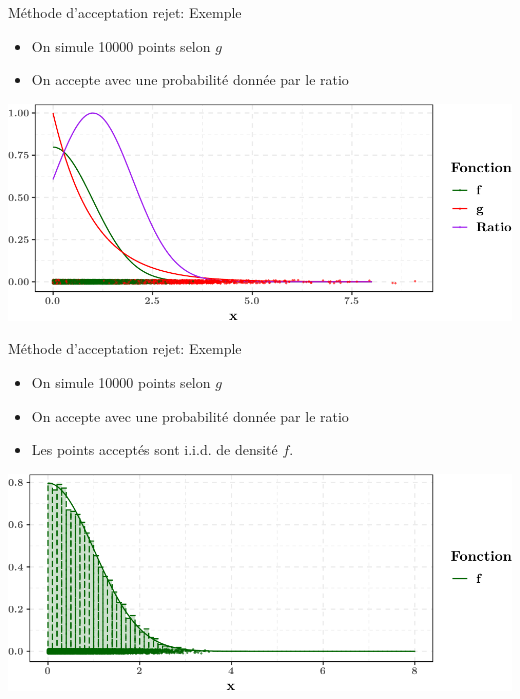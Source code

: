 \documentclass[ignorenonframetext,]{beamer}
\providecommand{\tightlist}{%
  \setlength{\itemsep}{0pt}\setlength{\parskip}{0pt}}
\begin{document}
\begin{frame}{Méthode d'acceptation rejet: Exemple}
\protect\hypertarget{muxe9thode-dacceptation-rejet-exemple-2}{}

\begin{itemize}
\tightlist
\item
  On simule 10000 points selon \(g\)
\item
  On accepte avec une probabilité donnée par le ratio
\end{itemize}

\includegraphics{diapos_simulation_variables_aleatoires_files/figure-beamer/plot_simulated_accepted-1.pdf}

\end{frame}

\begin{frame}{Méthode d'acceptation rejet: Exemple}
\protect\hypertarget{muxe9thode-dacceptation-rejet-exemple-3}{}

\begin{itemize}
\tightlist
\item
  On simule 10000 points selon \(g\)
\item
  On accepte avec une probabilité donnée par le ratio
\item
  Les points acceptés sont i.i.d. de densité \(f\).
\end{itemize}

\includegraphics{diapos_simulation_variables_aleatoires_files/figure-beamer/plot_simulated_plus_histo-1.pdf}

\end{frame}
\end{document}
